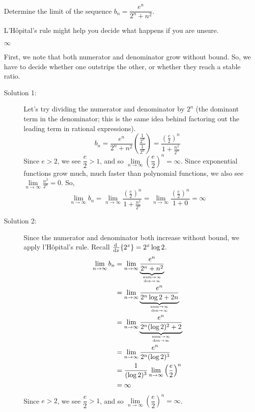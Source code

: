 
\begin{Mquestion}
Determine the limit of the sequence $b_n=\dfrac{e^n}{2^n+n^2}$.
\end{Mquestion}
\begin{hint}
L'H\^{o}pital's rule might help you decide what happens if you are unsure.
\end{hint}
\begin{answer}
$\infty$
\end{answer}
\begin{solution}
First, we note that both numerator and denominator grow without bound. So, we have to decide whether one outstrips the other, or whether they reach a stable ratio.

\begin{description}
\item[Solution 1:] Let's try dividing the numerator and denominator by $2^n$ (the dominant term in the denominator; this is the same idea behind factoring out the leading term in rational expressions).
\[b_n = \frac{e^n}{2^n+n^2}\left(\frac{\frac{1}{2^n}}{\frac{1}{2^n}}\right) = \frac{\left(\frac{e}{2}\right)^n}{1+\frac{n^2}{2^n}}\]
Since $e>2$, we see $\dfrac{e}{2}>1$, and so $\lim\limits_{n \to \infty}\left(\dfrac{e}{2}\right)^n=\infty$. Since exponential functions grow much, much faster than polynomial functions, we also see $\lim\limits_{n \to \infty}\frac{n^2}{2^n}=0$. So,
\[\lim\limits_{n \to \infty}b_n = \lim\limits_{n \to \infty}  \frac{\left(\frac{e}{2}\right)^n}{1+\frac{n^2}{2^n}}  = \lim\limits_{n \to \infty}  \frac{\left(\frac{e}{2}\right)^n}{1+0} = \infty\]
\item[Solution 2:] Since the numerator and denominator both increase without bound, we apply l'H\^{o}pital's rule. Recall $\diff{}{x}\{2^x\} = 2^x\log 2$.
\begin{align*}
\lim_{n \to \infty}b_n&=\lim_{n \to \infty}\underbrace{\dfrac{e^n}{2^n+n^2}}_{\atp{\mathrm{num}\to \infty}{\mathrm{den}\to\infty}}\\
&=\lim_{n \to \infty}\underbrace{\frac{e^n}{2^n\log 2 + 2n}}_{\atp{\mathrm{num}\to \infty}{\mathrm{den}\to\infty}}\\
&=\lim_{n \to \infty} \underbrace{\frac{e^n}{2^n(\log 2)^2 + 2}}_{\atp{\mathrm{num}\to\infty}{\mathrm{den}\to\infty}}\\
&=\lim_{n \to \infty}\frac{e^n}{2^n(\log 2)^3}\\
&=\frac{1}{(\log 2)^3}\lim_{n \to \infty}{\left(\frac{e}{2}\right)^n}\\
&=\infty
\end{align*}
Since $e>2$, we see $\dfrac{e}{2}>1$, and so $\lim\limits_{n \to \infty}\left(\dfrac{e}{2}\right)^n=\infty$.
\end{description}
\end{solution}

